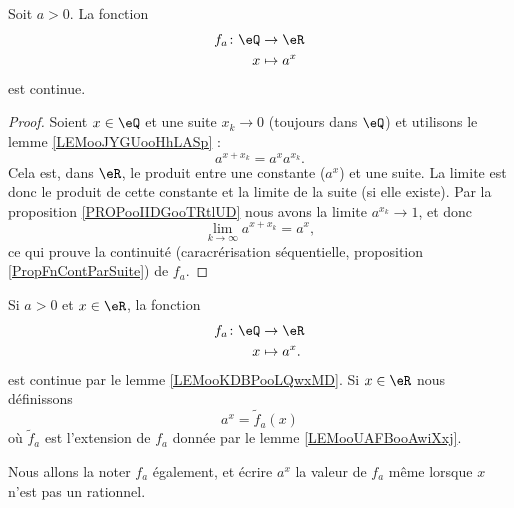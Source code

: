 \begin{lemma}       \label{LEMooKDBPooLQwxMD}
    Soit \( a>0\). La fonction
    \begin{equation}
        \begin{aligned}
            f_a\colon \eQ&\to \eR \\
            x&\mapsto a^x 
        \end{aligned}
    \end{equation}
    est continue.
\end{lemma}

\begin{proof}
    Soient \( x\in \eQ\) et une suite \( x_k\to 0\) (toujours dans \( \eQ\)) et utilisons le lemme \ref{LEMooJYGUooHhLASp} :
    \begin{equation}
        a^{x+x_k}=a^xa^{x_k}.
    \end{equation}
    Cela est, dans \( \eR\), le produit entre une constante (\( a^x\)) et une suite. La limite est donc le produit de cette constante et la limite de la suite (si elle existe). Par la proposition \ref{PROPooIIDGooTRtlUD} nous avons la limite \( a^{x_k}\to 1\), et donc
    \begin{equation}
        \lim_{k\to \infty} a^{x+x_k}=a^x,
    \end{equation}
    ce qui prouve la continuité (caracrérisation séquentielle, proposition \ref{PropFnContParSuite}) de \( f_a\).
\end{proof}

\begin{definition}  \label{DEFooOJMKooJgcCtq}
    Si \( a>0\) et \( x\in \eR\), la fonction
    \begin{equation}
        \begin{aligned}
            f_a\colon \eQ&\to \eR \\
            x&\mapsto a^x. 
        \end{aligned}
    \end{equation}
    est continue par le lemme \ref{LEMooKDBPooLQwxMD}. Si \( x\in \eR\) nous définissons
    \begin{equation}
        a^x=\tilde f_a(x)
    \end{equation}
    où \( \tilde f_a\) est l'extension de \( f_a\) donnée par le lemme \ref{LEMooUAFBooAwiXxj}.

    Nous allons la noter \( f_a\) également, et écrire \( a^x\) la valeur de \( f_a\) même lorsque \( x\) n'est pas un rationnel.
\end{definition}

